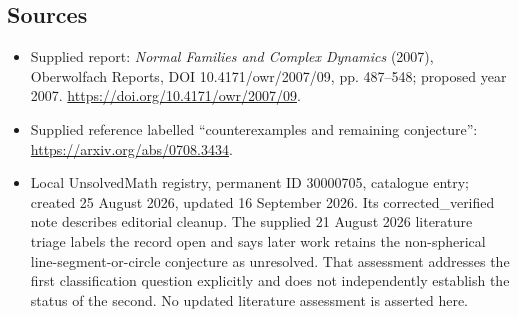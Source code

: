 \documentclass[11pt]{article}
\begin{document}
\subsection{Sources}
\begin{itemize}
\item Supplied report: \emph{Normal Families and Complex Dynamics} (2007), Oberwolfach Reports, DOI 10.4171/owr/2007/09, pp. 487--548; proposed year 2007. \url{https://doi.org/10.4171/owr/2007/09}.
\item Supplied reference labelled ``counterexamples and remaining conjecture'': \url{https://arxiv.org/abs/0708.3434}.
\item Local UnsolvedMath registry, permanent ID 30000705, catalogue entry; created 25 August 2026, updated 16 September 2026. Its corrected\_verified note describes editorial cleanup. The supplied 21 August 2026 literature triage labels the record open and says later work retains the non-spherical line-segment-or-circle conjecture as unresolved. That assessment addresses the first classification question explicitly and does not independently establish the status of the second. No updated literature assessment is asserted here.
\end{itemize}
\end{document}
